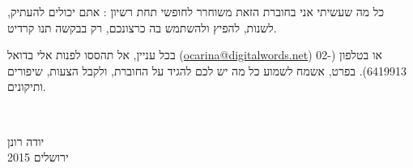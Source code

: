 כל מה שעשיתי אני בחוברת הזאת משוחרר לחופשי תחת רשיון : אתם יכולים להעתיק, לשנות, להפיץ ולהשתמש בה כרצונכם, רק בבקשה תנו קרדיט.

בכל עניין, אל תהססו לפנות אלי בדואל (\url{ocarina@digitalwords.net}) או בטלפון (02-6419913). בפרט, אשמח לשמוע כל מה יש לכם להגיד על החוברת, ולקבל הצעות, שיפורים ותיקונים.

\vspace{\baselineskip}
~\hfill
\begin{minipage}{3cm}
	יודה רונן\\
	ירושלים 2015\\
\end{minipage}
